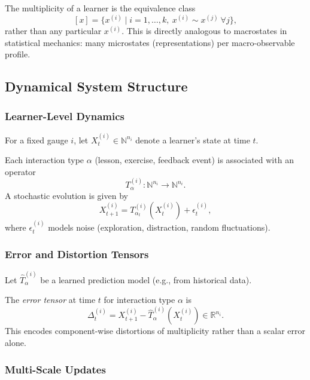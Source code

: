 \documentclass[11pt]{article}
\begin{document}
\begin{definition}
The multiplicity of a learner is the equivalence class
\[
[x] = \{ x^{(i)} \mid i=1,\dots,k,\ x^{(i)} \sim x^{(j)} \ \forall j \},
\]
rather than any particular $x^{(i)}$. This is directly analogous to macrostates in statistical mechanics: many microstates (representations) per macro-observable profile.
\end{definition}

\subsection{Dynamical System Structure}

\subsubsection{Learner-Level Dynamics}

For a fixed gauge $i$, let $X_t^{(i)} \in \mathbb{N}^{n_i}$ denote a learner’s state at time $t$.

\begin{definition}
Each interaction type $\alpha$ (lesson, exercise, feedback event) is associated with an operator
\[
T^{(i)}_\alpha : \mathbb{N}^{n_i} \to \mathbb{N}^{n_i}.
\]
A stochastic evolution is given by
\[
X^{(i)}_{t+1} = T^{(i)}_{\alpha_t}(X^{(i)}_t) + \epsilon^{(i)}_t,
\]
where $\epsilon^{(i)}_t$ models noise (exploration, distraction, random fluctuations).
\end{definition}

\subsubsection{Error and Distortion Tensors}

Let $\hat{T}^{(i)}_\alpha$ be a learned prediction model (e.g., from historical data).

\begin{definition}
The \emph{error tensor} at time $t$ for interaction type $\alpha$ is
\[
\Delta^{(i)}_t = X^{(i)}_{t+1} - \hat{T}^{(i)}_\alpha(X^{(i)}_t) \in \mathbb{R}^{n_i}.
\]
This encodes component-wise distortions of multiplicity rather than a scalar error alone.
\end{definition}

\subsubsection{Multi-Scale Updates}
\end{document}
